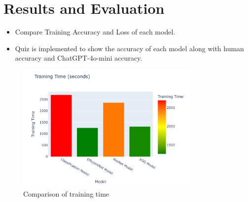 \documentclass{article}
\begin{document}
\section{Results and Evaluation}
\begin{itemize}
    \item Compare Training Accuracy and Loss of each model.
    \item Quiz is implemented to show the accuracy of each model along with human accuracy and ChatGPT-4o-mini accuracy.
\end{itemize}


\begin{figure}[H]
    \centering
    \includegraphics[width=0.80\textwidth]{eval4.png} 
    \caption{Comparison of training time}
    \label{fig:training_time}
\end{figure}
\end{document}
